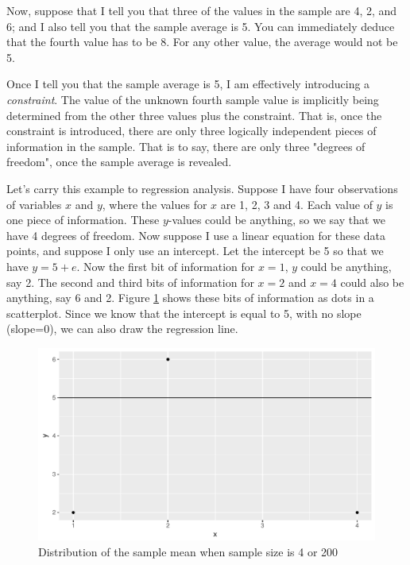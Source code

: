 \documentclass[]{report}\usepackage[]{graphicx}\usepackage[]{color}
\makeatletter
\def\maxwidth{ %
  \ifdim\Gin@nat@width>\linewidth
    \linewidth
  \else
    \Gin@nat@width
  \fi
}
\newenvironment{knitrout}{}{} %
\makeatother
\begin{document}
Now, suppose that I tell you that three of the values in the sample are 4, 2, and 6; and I also tell you that the sample average is 5. You can immediately deduce that the fourth value has to be 8. For any other value, the average would not be 5. 

Once I tell you that the sample average is 5, I am effectively introducing a \textit{constraint}. The value of the unknown fourth sample value is implicitly being determined from the other three values plus the constraint. That is, once the constraint is introduced, there are only three logically independent pieces of information in the sample. That is to say, there are only three "degrees of freedom", once the sample average is revealed.

Let's carry this example to regression analysis. Suppose I have four observations of variables $x$ and $y$, where the values for $x$ are 1, 2, 3 and 4. Each value of $y$ is one piece of information. These $y$-values could be anything, so we say that we have 4 degrees of freedom. Now suppose I use a linear equation for these data points, and suppose I only use an intercept. Let the intercept be 5 so that we have $y=5+e$. Now the first bit of information for $x=1$, $y$ could be anything, say 2. The second and third bits of information for $x=2$ and $x=4$ could also be anything, say 6 and 2. Figure \ref{fig:inf_11} shows these bits of information as dots in a scatterplot. Since we know that the intercept is equal to 5, with no slope (slope=0), we can also draw the regression line.

\begin{knitrout}
\color{fgcolor}\begin{figure}

{\centering \includegraphics[width=\maxwidth]{figure/inf_11-1} 

}

\caption[Distribution of the sample mean when sample size is 4 or 200]{Distribution of the sample mean when sample size is 4 or 200}\label{fig:inf_11}
\end{figure}


\end{knitrout}
\end{document}
